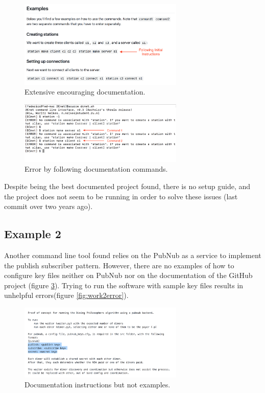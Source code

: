 \begin{figure}[h!]
    \centering
    \includegraphics[width=0.7\textwidth]{Images/work1WellDocumented.png}
    \caption{Extensive encouraging documentation.}
    \label{fig:work1documentation}
\end{figure}

\begin{figure}[h!]
    \centering
    \includegraphics[width=0.7\textwidth]{Images/work1WellDocumentedError.png}
    \caption{Error by following documentation commands.}
    \label{fig:work1error}
\end{figure}

Despite being the best documented project found, there is no setup guide, and the project does not seem to be running in order to solve these issues (last commit over two years ago).

\subsection{Example 2}
Another command line tool found relies on the PubNub as a service to implement the publish subscriber pattern. However, there are no examples of how to configure key files neither on PubNub nor on the documentation of the GitHub project (figure \ref{fig:work2documentation}). Trying to run the software with sample key files results in unhelpful errors(figure \ref{fig:work2error}). 

\begin{figure}[h!]
    \centering
    \includegraphics[width=0.7\textwidth]{Images/work2Documentation.png}
    \caption{Documentation instructions but not examples.}
    \label{fig:work2documentation}
\end{figure}

